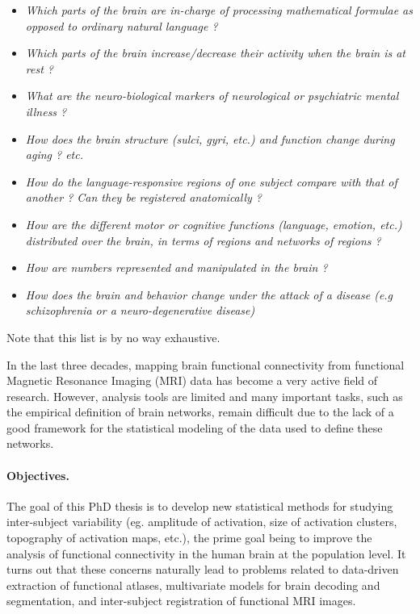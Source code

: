 \begin{itemize}
  \item \textit{Which parts of the brain are in-charge of processing mathematical formulae as opposed to ordinary natural language ?}
  \item \textit{Which parts of the brain increase/decrease their activity when the brain is at rest ?}
  \item \textit{What are the neuro-biological markers of neurological or psychiatric mental illness ?}
  \item \textit{How does the brain structure (sulci, gyri, etc.) and function change during aging ? etc.}
 \item \textit{How do the language-responsive regions of one subject compare with that of another ? Can they be registered anatomically ?}
 \item \textit{How are the different motor or cognitive functions (language, emotion, etc.) distributed over the brain, in terms of regions and networks of regions ?}
 \item \textit{How are numbers represented and manipulated in the brain ?}
\item \textit{How does the brain and behavior change under the attack of a disease (e.g schizophrenia or a neuro-degenerative disease)}   
\end{itemize}
Note that this list is by no way exhaustive.

In the last three decades, mapping brain functional connectivity from
functional Magnetic Resonance Imaging (MRI) data has become a very
active field of research. However, analysis tools are limited and many
important tasks, such as the empirical definition of brain networks,
remain difficult due to the lack of a good framework for the
statistical modeling of the data used to define these networks.
%

\paragraph{Objectives.} The goal of this PhD thesis is to develop new statistical methods for studying inter-subject variability (eg. amplitude of activation, size of activation clusters, topography of activation maps, etc.), the prime goal being to improve the analysis of functional connectivity in the human brain at the population level. It turns out that these concerns naturally lead to problems related to data-driven extraction of functional atlases, multivariate models for brain decoding and segmentation, and inter-subject registration of functional MRI images.

